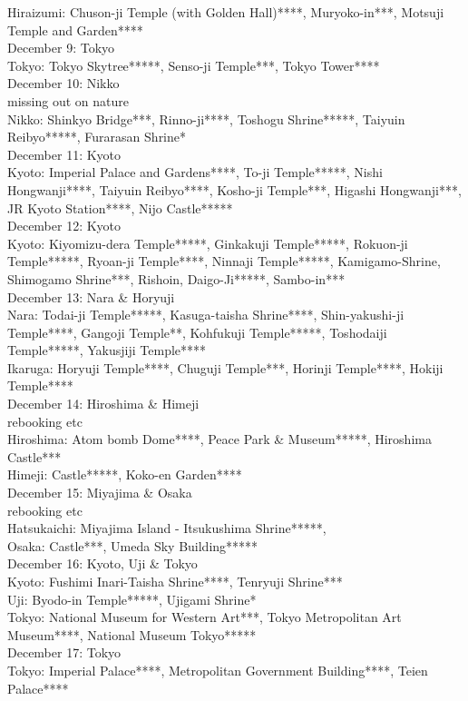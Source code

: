 Hiraizumi: Chuson-ji Temple (with Golden Hall)****, Muryoko-in***, Motsuji Temple and Garden****\\

December 9: Tokyo\\
Tokyo: Tokyo Skytree*****, Senso-ji Temple***, Tokyo Tower****\\

December 10: Nikko\\
missing out on nature\\

Nikko: Shinkyo Bridge***, Rinno-ji****, Toshogu Shrine*****, Taiyuin Reibyo*****, Furarasan Shrine*\\

December 11: Kyoto\\
Kyoto: Imperial Palace and Gardens****, To-ji Temple*****, Nishi Hongwanji****, Taiyuin Reibyo****, Kosho-ji Temple***, Higashi Hongwanji***, JR Kyoto Station****, Nijo Castle*****\\

December 12: Kyoto\\
Kyoto: Kiyomizu-dera  Temple*****, Ginkakuji  Temple*****, Rokuon-ji  Temple*****, Ryoan-ji Temple****, Ninnaji Temple*****, Kamigamo-Shrine, Shimogamo Shrine***, Rishoin, Daigo-Ji*****, Sambo-in***\\

December 13: Nara \& Horyuji\\
Nara: Todai-ji Temple*****, Kasuga-taisha Shrine****, Shin-yakushi-ji Temple****, Gangoji Temple**, Kohfukuji Temple*****, Toshodaiji Temple*****, Yakusjiji Temple****\\
Ikaruga: Horyuji Temple****, Chuguji Temple***, Horinji Temple****, Hokiji Temple****\\

December 14: Hiroshima \& Himeji\\
rebooking etc\\

Hiroshima: Atom bomb Dome****, Peace Park \& Museum*****, Hiroshima Castle***\\
Himeji: Castle*****, Koko-en Garden****\\

December 15: Miyajima \& Osaka\\
rebooking etc\\

Hatsukaichi: Miyajima Island - Itsukushima Shrine*****,\\
Osaka: Castle***, Umeda Sky Building*****\\

December 16: Kyoto, Uji \& Tokyo\\
Kyoto: Fushimi Inari-Taisha Shrine****, Tenryuji Shrine***\\
Uji: Byodo-in Temple*****, Ujigami Shrine*\\
Tokyo: National Museum for Western Art***, Tokyo Metropolitan Art Museum****, National Museum Tokyo*****\\

December 17: Tokyo\\
Tokyo: Imperial Palace****, Metropolitan Government Building****, Teien Palace****